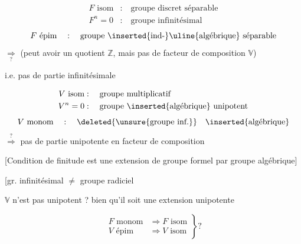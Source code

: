 
\[
\begin{aligned}
F\text{ isom}&:\quad\text{groupe discret séparable}\\
F^n=0&:\quad\text{groupe infinitésimal}
\end{aligned}
\]
\[
F\text{ épim}\quad :\quad \text{groupe \inserted{ind-}\uline{algébrique} séparable}
\]
$\underset{?}{\Longrightarrow}$ (peut avoir un quotient $\mathbb Z$, mais pas de facteur de composition $\mathbb V$)

i.e. pas de partie infinitésimale

\[
\begin{aligned}
V\text{ isom}&:\quad\text{groupe multiplicatif}\\
V^n=0&:\quad\text{groupe \inserted{algébrique} unipotent}
\end{aligned}
\]
\[
V\text{ monom}\quad :\quad\deleted{\text{\unsure{groupe inf.}}}\quad\text{\inserted{algébrique}}
\]
$\overset{?}{\Longrightarrow}$ pas de partie unipotente en facteur de composition

[Condition de finitude est   une extension de groupe formel par groupe algébrique]

[gr. infinitésimal $\ne$ groupe radiciel

$\mathbb V$ n'est pas unipotent ? bien qu'il soit une extension unipotente

\[
\left.\begin{aligned}
F\text{ monom}&\Longrightarrow F\text{ isom}\\
V\text{ épim}&\Longrightarrow V\text{ isom}
\end{aligned}\right\}?
\]

